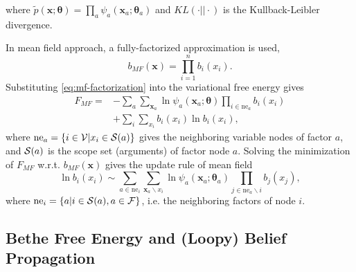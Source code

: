 where $\tilde{p}(\bm{x}; \bm{\theta}) =  \prod_{a} \psi_a(\bm{x}_a; \bm{\theta}_a)$ and $KL(\cdot || \cdot)$ is the Kullback-Leibler divergence.

In mean field approach, a fully-factorized approximation is used,
\begin{equation}\label{eq:mf-factorization}
  b_{MF}(\bm{x}) = \prod_{i=1}^{n}b_i(x_i).
\end{equation}
Substituting \eqref{eq:mf-factorization} into the variational free energy gives
\begin{align}
  F_{MF} = & - \sum_{a}\sum_{\bm{x}_a} \ln{\psi_a(\bm{x}_{a};\bm{\theta})}
             \prod_{i\in \mathrm{ne}_a}b_i(x_i) \nonumber\\
           &+ \sum_i \sum_{x_i} b_i(x_i) \ln{b_i(x_i)},
\end{align}
where $\mathrm{ne}_a = \left\{ i \in \mathcal{V} | x_i \in \mathcal{S}(a) \right\}$ gives the neighboring variable nodes of factor $a$, and $\mathcal{S}(a)$ is the scope set (arguments) of factor node $a$.
Solving the minimization of $F_{MF}$ w.r.t. $b_{MF}(\bm{x})$ gives the
update rule of mean field
\begin{equation}
  \ln{b_i(x_i)} \sim \sum_{a\in \mathrm{ne}_i} \sum_{\bm{x}_a \backslash x_i} \ln{\psi_a}(\bm{x}_a;\bm{\theta}_a) \prod_{j\in \mathrm{ne}_a\backslash i} b_j(x_j),
\end{equation}
where $\mathrm{ne}_i = \left\{ a | i \in \mathcal{S}(a), a \in \mathcal{F} \right\}$, i.e. the
neighboring factors of node $i$.

\subsection{Bethe Free Energy and (Loopy) Belief Propagation}


